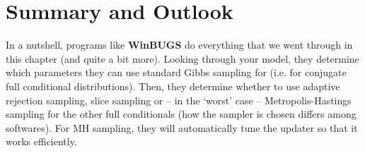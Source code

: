 
\section{Summary and Outlook}

In a nutshell, programs like {\bf WinBUGS} do everything that we
went through in this chapter (and quite a bit more). Looking through
your model, they determine which parameters they can use standard
Gibbs sampling for (i.e. for conjugate full conditional distributions).
Then, they determine whether to use adaptive
rejection sampling, slice sampling or -- in the `worst' case --
Metropolis-Hastings sampling for the other full conditionals (how the sampler is chosen differs among softwares). For MH sampling, they will
automatically tune the updater so that it works efficiently.

